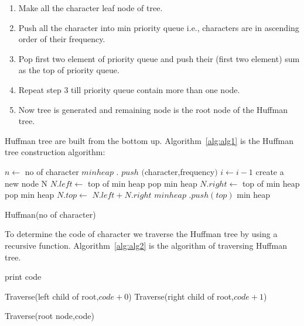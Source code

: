 \documentclass[conference]{IEEEtran}
\begin{document}
\begin{enumerate}
\label{list:e1}
\item Make all the character leaf node of tree.
\item Push all the character  into min priority queue i.e., characters are in ascending order of their frequency.
\item Pop first two element of priority queue and push their (first two element) sum as the top of priority queue.
\item Repeat step 3 till priority queue contain more than one  node.
\item Now tree is generated and remaining  node  is the root node of the Huffman tree.
\end{enumerate}
\vspace{.5cm}
Huffman tree are built from the bottom up\cite{nelson1995data}.
Algorithm~\ref{alg:alg1} is the Huffman tree construction algorithm:\cite{cormen2009introduction}
\begin{algorithm}[H]
\begin{algorithmic}
\STATE $n\gets$ no of character
 \STATE $min heap$ $.$ $push$ $($character,frequency$)$
 \STATE $i\gets i-1$
 \ENDFOR
 \STATE create a new node N
 \STATE $N.left\gets $ top of min heap
 \STATE pop min heap
 \STATE $N.right\gets$ top of min heap
  \STATE pop min heap
  \STATE $N.top\gets$ $ N.left+N.right$
  \STATE $min heap$ $.push(top)$
  \ENDWHILE
 \RETURN min heap
\end{algorithmic}
\caption{Huffman(no of character)}
\label{alg:alg1}
\end{algorithm}

To determine the code of character we traverse the Huffman tree by using a recursive function. Algorithm~\ref{alg:alg2} is the algorithm of traversing Huffman tree.

\begin{algorithm}[H]
\begin{algorithmic}
\RETURN 
\ENDIF
{}
\STATE print code
\ENDIF

\STATE Traverse(left child of root,$code+0$)
\STATE Traverse(right child of root,$code+1$)



\end{algorithmic}
\caption{Traverse(root node,code)}
\label{alg:alg2}
\end{algorithm}
\end{document}
